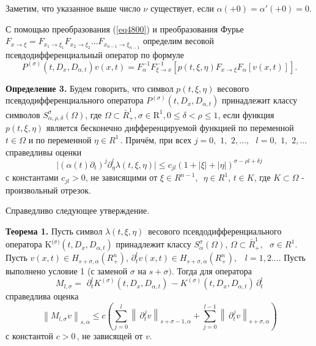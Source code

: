 Заметим, что указанное выше число $\nu $ существует, если $\alpha ( + 0) =
\alpha '( + 0) = 0$.

С помощью преобразования (\ref{eq4800}) и преобразования Фурье $F_{x \to \xi } = F_{x_1
\to \xi _1 } F_{x_2 \to \xi _2 } ...F_{x_{n - 1} \to \xi _{n - 1} } $
определим весовой псевдодифференциальный оператор по формуле
\[
P^{(\sigma )}(t,D_x ,D_{\alpha ,t} )v(x,t) = F_\alpha ^{ - 1} F_{\xi \to
x}^{ - 1} [p(t,\xi ,\eta )F_{x \to \xi } F_\alpha [v(x,t)]].
\]



\textbf{Определение 3.} Будем говорить, что символ $p(t,\xi ,\eta )$
весового псевдодифференциального оператора $P^{(\sigma )}(t,D_x ,D_{\alpha
,t} )$ принадлежит классу символов $S_{\alpha ,\rho ,\delta }^\sigma (\Omega
)$, где $\Omega \subset \bar {R}_ + ^1 ,
\sigma \in
\mbox{R}^1, 0 \leqslant \delta < \rho \leqslant 1$, если функция $p(t,\xi ,\eta )$
является бесконечно дифференцируемой функцией по переменной $t \in \Omega $
и по переменной $\eta \in R^1\,$. Причём, при всех $j =
0,\,\,1,\,\,2,...,\,\,\,\,l = 0,\,\,1,\,\,2,...$ справедливы оценки
\[
\vert (\alpha (t)\partial _t )^j\partial _\eta ^l \lambda (t,\xi ,\eta
)\vert \leqslant c_{jl} (1 + \left| \xi \right| + \left| \eta \right|)^{\sigma -
\rho l + \delta j}
\]
с константами $c_{jl} > 0$, не зависящими от $\xi \in R^{n - 1},\,\,\,\eta
\in R^1$, $t \in K$, где $K \subset \Omega $ - произвольный отрезок.

Справедливо следующее утверждение.

\textbf{Теорема 1.} Пусть символ $\lambda (t,\xi ,\eta )\,$ весового
псевдодифференциального оператора $\mbox{K}^{\mbox{(}\sigma \mbox{)}}(t,D_x
,D_{\alpha ,t} )$ принадлежит классу $S_\alpha ^\sigma (\Omega )$, $\Omega
\subset \bar {R}_ + ^1 ,\,\,\,\,\sigma \in R^1$. Пусть $v(x,t) \in H_{s +
\sigma ,\alpha } (R_ + ^n )$, $\partial _t^l v(x,t) \in H_{s + \sigma
,\alpha } (R_ + ^n ),\,\,\,\,\,l = 1,2...$. Пусть выполнено условие 1 (с
заменой $\sigma $ на $s + \sigma )$. Тогда для оператора
\begin{equation}
\label{eq4801}
M_{l,\sigma } = \,\,\partial _t^l K^{(\sigma )}(t,D_x ,D_{\alpha ,t} )\, -
K^{(\sigma )}(t,D_x ,D_{\alpha ,t} )\,\partial _t^l
\end{equation}
справедлива оценка
\[
\left\| {M_{l,\sigma } v} \right\|_{s,\alpha } \leqslant c(\sum\limits_{j = 0}^l
{\left\| {\,\partial _t^j v} \right\|_{s + \sigma - 1,\alpha } } +
\sum\limits_{j = 0}^{l - 1} {\left\| {\,\partial _t^j v} \right\|_{s +
\sigma ,\alpha } } )
\]
с константой $c > 0\,$, не зависящей от $v$.


